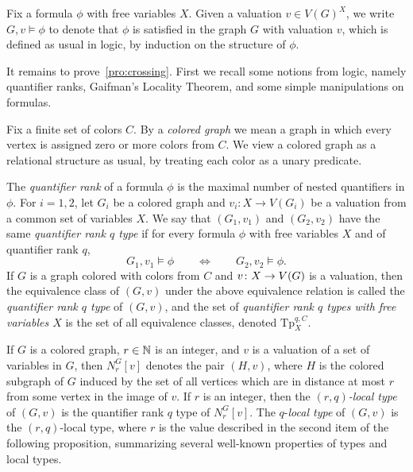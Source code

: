 

Fix a formula $\phi$ with free variables $X$.
Given a valuation $v\in V(G)^X$, we write $G,v\models \phi$ to denote that $\phi$ is satisfied 
in the graph $G$ with valuation $v$, which is defined as usual in logic, by induction on the structure of $\phi$.




It remains to prove~\cref{pro:crossing}. 
First we recall some notions from logic, namely quantifier ranks, Gaifman's Locality Theorem, and some simple manipulations on formulas.

 Fix a finite set of  colors $C$.
By a \emph{colored graph} we mean a graph  in which 
every vertex is assigned zero or more colors from $C$. We view a colored graph as a relational structure as usual, by treating each color as a unary predicate. 

The \emph{quantifier rank} of a formula $\phi$ is the maximal number of nested quantifiers in $\phi$.
For $i=1,2$, let $G_i$
be a colored graph and $v_i:X\to V(G_i)$ be a valuation
from a common set of variables $X$.
We say that $(G_1, v_1)$ and $(G_2,v_2)$
have the same \emph{quantifier rank $q$ type} %
if for every formula $\phi$ with  free variables $X$ and of quantifier rank $q$,
 $$G_1,v_1\models \phi\qquad\iff \qquad G_2,v_2\models \phi.$$
If $G$ is a graph colored with colors from $C$ and 
 $v\colon X\to V(G)$ is a valuation, 
then the equivalence class of $(G, v)$ under the above equivalence relation is called the \emph{quantifier rank $q$ type} of $(G,v)$, and  the set of \emph{quantifier rank $q$ types with  free variables $X$}
is the set of all equivalence classes, denoted
$\mathrm{Tp}^{q,C}_X$.

 If $G$ is a colored graph, $r\in\mathbb{N}$ is an integer, and $v$ is a valuation of a set of variables in $G$, then  $N^G_r[v]$ denotes the pair $(H,v)$, where $H$ is the colored subgraph of $G$
induced by the set of all vertices which are in distance at most $r$
from some vertex in the image of $v$.
If $r$ is an integer, then the \emph{$(r,q)$-local type} of $(G,v)$ is 
the quantifier rank $q$ type of $N^G_r[v]$. The $q$-\emph{local type} of $(G,v)$ is the $(r,q)$-local type, where $r$   is the value described in the second item of the following proposition,  summarizing several well-known properties of types and local types.


